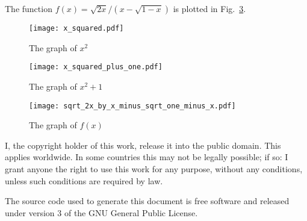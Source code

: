 \documentclass{article}
\begin{document}
    The function $f(x)=\sqrt{2x}/(x-\sqrt{1-x})$ is plotted in
    Fig.~\ref{fig:sqrt_2x_by_x_minus_sqrt_one_minus_x}.
    \begin{figure}
        \centering
        \texttt{[image: x\_squared.pdf]}
        \caption{The graph of $x^{2}$}
        \label{fig:x_squared}
    \end{figure}
    \begin{figure}
        \centering
        \texttt{[image: x\_squared\_plus\_one.pdf]}
        \caption{The graph of $x^{2}+1$}
        \label{fig:x_squared_plus_one}
    \end{figure}
    \begin{figure}
        \centering
        \texttt{[image: sqrt\_2x\_by\_x\_minus\_sqrt\_one\_minus\_x.pdf]}
        \caption{The graph of $f(x)$}
        \label{fig:sqrt_2x_by_x_minus_sqrt_one_minus_x}
    \end{figure}
    \newpage
    I, the copyright holder of this work, release it into the public domain.
    This applies worldwide. In some countries this may not be legally possible;
    if so: I grant anyone the right to use this work for any purpose, without
    any conditions, unless such conditions are required by law.
    \par\hfill\par
    The source code used to generate this document is free software and released
    under version 3 of the GNU General Public License.
\end{document}
